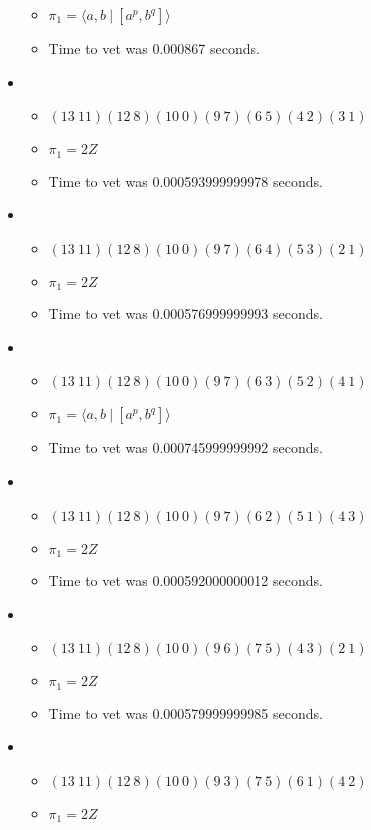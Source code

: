 \documentclass{article}
\begin{document}
\begin{itemize}
\begin{itemize}
      \item $\pi_1 = \langle a,b\ |\ [a^p,b^q]\rangle$
      \item Time to vet was 0.000867 seconds.
\end{itemize}
\item \begin{itemize}
      \item $(13\ 11)(12\ 8)(10\ 0)(9\ 7)(6\ 5)(4\ 2)(3\ 1)$
      \item $\pi_1 =2 Z$
      \item Time to vet was 0.000593999999978 seconds.
\end{itemize}
\item \begin{itemize}
      \item $(13\ 11)(12\ 8)(10\ 0)(9\ 7)(6\ 4)(5\ 3)(2\ 1)$
      \item $\pi_1 =2 Z$
      \item Time to vet was 0.000576999999993 seconds.
\end{itemize}
\item \begin{itemize}
      \item $(13\ 11)(12\ 8)(10\ 0)(9\ 7)(6\ 3)(5\ 2)(4\ 1)$
      \item $\pi_1 = \langle a,b\ |\ [a^p,b^q]\rangle$
      \item Time to vet was 0.000745999999992 seconds.
\end{itemize}
\item \begin{itemize}
      \item $(13\ 11)(12\ 8)(10\ 0)(9\ 7)(6\ 2)(5\ 1)(4\ 3)$
      \item $\pi_1 =2 Z$
      \item Time to vet was 0.000592000000012 seconds.
\end{itemize}
\item \begin{itemize}
      \item $(13\ 11)(12\ 8)(10\ 0)(9\ 6)(7\ 5)(4\ 3)(2\ 1)$
      \item $\pi_1 =2 Z$
      \item Time to vet was 0.000579999999985 seconds.
\end{itemize}
\item \begin{itemize}
      \item $(13\ 11)(12\ 8)(10\ 0)(9\ 3)(7\ 5)(6\ 1)(4\ 2)$
      \item $\pi_1 =2 Z$

\end{itemize}
\end{itemize}
\end{document}

